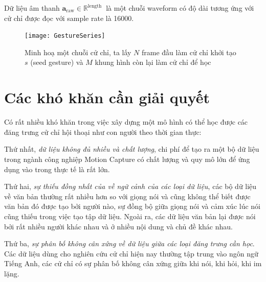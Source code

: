 Dữ liệu âm thanh $\mathbf{a}_{\text{raw}} \in \mathbb{R}^{ \text{length } }$  là một chuỗi waveform có độ dài tương ứng với cử chỉ được đọc với sample rate là 16000. 

\begin{figure}
	\centering
	\texttt{[image: GestureSeries]}
	\caption{Minh hoạ một chuỗi cử chỉ, ta lấy $N$ frame đầu làm cử chỉ khởi tạo $s$ (seed gesture) và $M$ khung hình còn lại làm cử chỉ để học}
	\label{fig:GestureSeries}
\end{figure}





\section{Các khó khăn cần giải quyết}

Có rất nhiều khó khăn trong việc xây dựng một mô hình có thể học được các đăng trưng cử chỉ hội thoại như con người theo thời gian thực:

Thứ nhất, \textit{dữ liệu không đủ nhiều và chất lượng}, chi phí để tạo ra một bộ dữ liệu trong ngành công nghiệp Motion Capture có chất lượng và quy mô lớn để ứng dụng vào trong thực tế là rất lớn.

Thứ hai, \textit{sự thiếu đồng nhất của về ngữ cảnh của các loại dữ liệu}, các bộ dữ liệu về văn bản thường rất nhiều hơn so với giọng nói và cũng không thể biết được văn bản đó được tạo bởi người nào, sự đồng bộ giữa giọng nói và cảm xúc lúc nói cũng thiếu trong việc tạo tập dữ liệu. Ngoài ra, các dữ liệu văn bản lại được nói bởi rất nhiều người khác nhau và ở nhiều nội dung và chủ đề khác nhau.
 
Thứ ba, \textit{sự phân bố không cân xứng về  dữ liệu giữa các loại đăng trưng cần học}. Các dữ liệu dùng cho nghiên cứu cử chỉ hiện nay thường tập trung vào ngôn ngữ Tiếng Anh, các cử chỉ có sự phân bố không cân xứng giữa khi nói, khi hỏi, khi im lặng.

